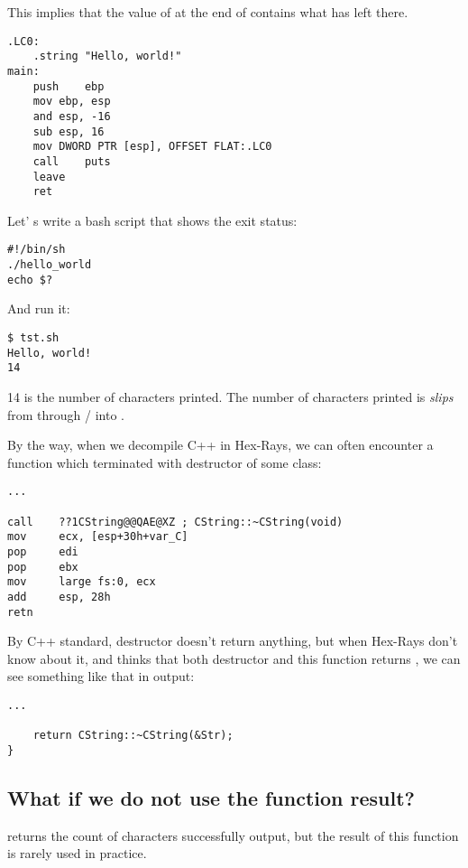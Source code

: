 This implies that the value of \EAX at the end of \main contains what \puts has left there.

\begin{lstlisting}[caption=GCC 4.8.1,style=customasmx86]
.LC0:
	.string	"Hello, world!"
main:
	push	ebp
	mov	ebp, esp
	and	esp, -16
	sub	esp, 16
	mov	DWORD PTR [esp], OFFSET FLAT:.LC0
	call	puts
	leave
	ret
\end{lstlisting}


Let' s write a bash script that shows the exit status:

\begin{lstlisting}[caption=tst.sh]
#!/bin/sh
./hello_world
echo $?
\end{lstlisting}

And run it:

\begin{lstlisting}
$ tst.sh 
Hello, world!
14
\end{lstlisting}

14 is the number of characters printed.
The number of characters printed is \textit{slips} from \printf{} through / into .

By the way, when we decompile C++ in Hex-Rays, we can often encounter a function which terminated with destructor of
some class:

\begin{lstlisting}[style=customasmx86]
...

call    ??1CString@@QAE@XZ ; CString::~CString(void)
mov     ecx, [esp+30h+var_C]
pop     edi
pop     ebx
mov     large fs:0, ecx
add     esp, 28h
retn
\end{lstlisting}

By C++ standard, destructor doesn't return anything, but when Hex-Rays don't know about it, and thinks that both
destructor and this function returns \Tint, we can see something like that in output:

\begin{lstlisting}[style=customc]
...

	return CString::~CString(&Str);
}
\end{lstlisting}

\subsection{What if we do not use the function result?}

\printf returns the count of characters successfully output, but the result of this function 
is rarely used in practice.

